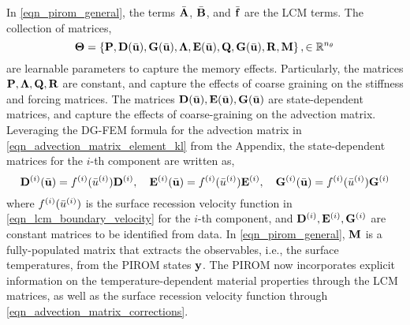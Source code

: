 In \cref{eqn_pirom_general}, the terms $\bar{\mathbf{A}}$, $\bar{\mathbf{B}}$, and $\bar{\mathbf{f}}$ are the LCM terms. The collection of matrices,
\begin{equation}
    \boldsymbol{\Theta} = \left\{\mathbf{P},\mathbf{D}(\bar{\mathbf{u}}),\mathbf{G}(\bar{\mathbf{u}}),\boldsymbol{\Lambda},\mathbf{E}(\bar{\mathbf{u}}),\mathbf{Q},\mathbf{G}(\bar{\mathbf{u}}),\mathbf{R},\mathbf{M}\right\},\in\mathbb{R}^{n_{\theta}}
\end{equation}
are learnable parameters to capture the memory effects. Particularly, the matrices $\mathbf{P},\boldsymbol{\Lambda},\mathbf{Q},\mathbf{R}$ are constant, and capture the effects of coarse graining on the stiffness and forcing matrices. The matrices $\mathbf{D}(\bar{\mathbf{u}}),\mathbf{E}(\bar{\mathbf{u}}),\mathbf{G}(\bar{\mathbf{u}})$ are state-dependent matrices, and capture the effects of coarse-graining on the advection matrix. Leveraging the DG-FEM formula for the advection matrix in \cref{eqn_advection_matrix_element_kl} from the Appendix, the state-dependent matrices for the $i$-th component are written as,
\begin{equation}
    \mathbf{D}^{(i)}(\bar{\mathbf{u}}) = f^{(i)}(\bar{u}^{(i)})\mathbf{D}^{(i)}, \quad \mathbf{E}^{(i)}(\bar{\mathbf{u}}) = f^{(i)}(\bar{u}^{(i)})\mathbf{E}^{(i)}, \quad \mathbf{G}^{(i)}(\bar{\mathbf{u}}) = f^{(i)}(\bar{u}^{(i)})\mathbf{G}^{(i)}\label{eqn_advection_matrix_corrections}
\end{equation}
where $f^{(i)}(\bar{u}^{(i)})$ is the surface recession velocity function in \cref{eqn_lcm_boundary_velocity} for the $i$-th component, and $\mathbf{D}^{(i)},\mathbf{E}^{(i)},\mathbf{G}^{(i)}$ are constant matrices to be identified from data. In \cref{eqn_pirom_general}, $\mathbf{M}$ is a fully-populated matrix that extracts the observables, i.e., the surface temperatures, from the PIROM states $\mathbf{y}$. The PIROM now incorporates explicit information on the temperature-dependent material properties through the LCM matrices, as well as the surface recession velocity function through \cref{eqn_advection_matrix_corrections}.